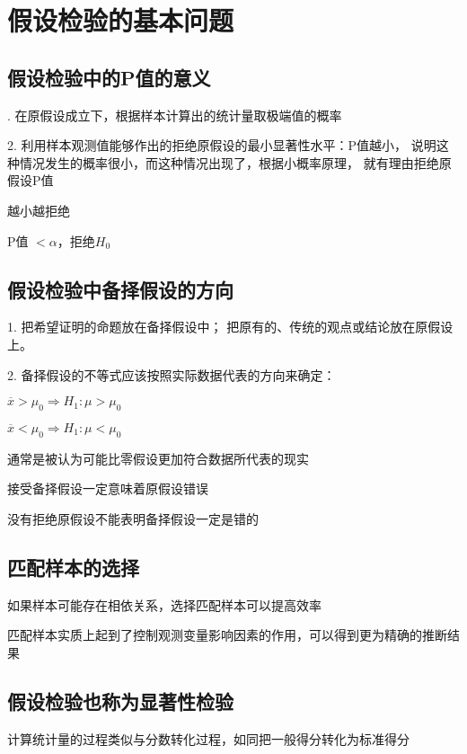 \documentclass[UTF8,10pt]{book}
\begin{document}
    \section{假设检验的基本问题}
        \subsection{假设检验中的P值的意义}
        {. 在原假设成立下，根据样本计算出的统计量取极端值的概率 
        
        2. 利用样本观测值能够作出的拒绝原假设的最小显著性水平：P值越小，
        说明这种情况发生的概率很小，而这种情况出现了，根据小概率原理，
        就有理由拒绝原假设P值}
        
        越小越拒绝
        
        P值  $<\alpha$，拒绝$H_0$
        \subsection{假设检验中备择假设的方向}
        1. 把希望证明的命题放在备择假设中； 
        把原有的、传统的观点或结论放在原假设上。 
        
        2. 备择假设的不等式应该按照实际数据代表的方向来确定： 
        
        $ \overline{x} > \mu_0 \Rightarrow H_1:\mu>\mu_0 $ 
        
        $ \overline{x} < \mu_0 \Rightarrow H_1:\mu<\mu_0 $ 
        
        通常是被认为可能比零假设更加符合数据所代表的现实

        {\kaishu 接受备择假设一定意味着原假设错误	
        
        没有拒绝原假设不能表明备择假设一定是错的}
        \subsection{匹配样本的选择}	
        如果样本可能存在相依关系，选择匹配样本可以提高效率 
        
        匹配样本实质上起到了控制观测变量影响因素的作用，可以得到更为精确的推断结果
        \subsection{假设检验也称为显著性检验}	

        计算统计量的过程类似与分数转化过程，如同把一般得分转化为标准得分	
\end{document}
